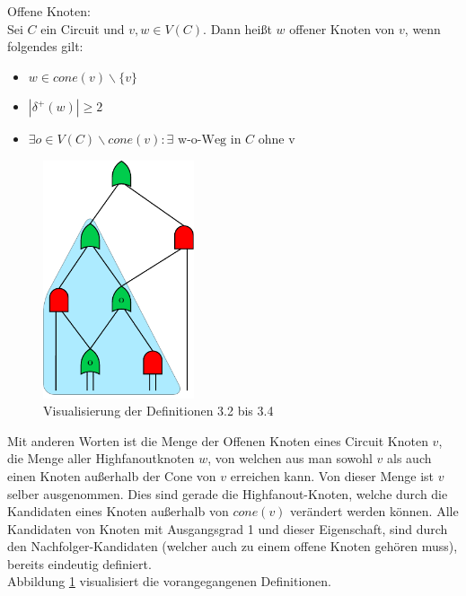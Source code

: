 \documentclass[11pt, a4paper, german]{article}
\begin{document}
\begin{definition}{Offene Knoten:}\\
	Sei $C$ ein Circuit und $v,w \in V(C)$. Dann heißt $w$ offener Knoten von $v$, wenn folgendes gilt: 
	\begin{itemize}
		\item $ w \in cone(v)\backslash \{ v \} $
		\item $| \delta ^{+}(w)| \geq 2$
		\item $ \exists o \in V(C) \backslash cone(v) : \exists \text{ w-o-Weg in } C \text{ ohne v} $
	\end{itemize}	
\end{definition}
 \begin{figure}
		\includegraphics[height = 7cm]{pictures/compiled/cone}
		\caption{Visualisierung der Definitionen 3.2 bis 3.4}
		\label{bild:cone}
\end{figure}
Mit anderen Worten ist die Menge der Offenen Knoten eines Circuit Knoten $v$, die Menge aller Highfanoutknoten $w$, von welchen aus man sowohl $v$ als auch einen Knoten außerhalb der Cone von $v$ erreichen kann. Von dieser Menge ist $v$ selber ausgenommen. Dies sind gerade die Highfanout-Knoten, welche durch die Kandidaten eines Knoten außerhalb von $cone(v)$ verändert werden können. Alle Kandidaten von  Knoten mit Ausgangsgrad 1 und dieser Eigenschaft, sind durch den Nachfolger-Kandidaten (welcher auch zu einem offene Knoten gehören muss), bereits eindeutig definiert. \\
Abbildung \ref{bild:cone} visualisiert die vorangegangenen Definitionen.\\
\end{document}
